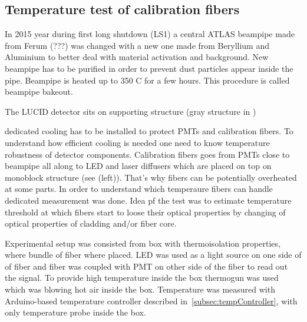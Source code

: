 \subsection{Temperature test of calibration fibers}


In 2015 year during first long shutdown (LS1) a central ATLAS beampipe made from Ferum (???) 
was changed with a new one made from Beryllium and Aluminium to better deal with material activation and background.
New beampipe has to be purified in order to prevent dust particles appear inside the pipe.
Beampipe is heated up to 350 \degree C for a few hours. This procedure is called beampipe bakeout.

The LUCID detector sits on supporting structure (gray structure in )

dedicated cooling has to be installed to protect PMTs and calibration fibers.
To understand how efficient cooling is needed 
one need to know temperature robustness of detector components.
Calibration fibers goes from PMTs close to beampipe all along to LED and laser diffusers which are placed on top on monoblock structure 
(see  (left)).
That's why fibers can be potentially overheated at some parts. 
In order to understand which temperaure fibers can handle dedicated measurement was done. 
Idea pf the test was to estimate temperature threshold at which fibers start to loose their optical properties
by changing of optical properties of cladding and/or fiber core.

Experimental setup was consisted from box with thermoisolation properties, 
where bundle of fiber where placed.
LED was used as a light source on one side of of fiber and fiber was coupled with PMT on other side of the fiber to read out the signal.
To provide high temperature inside the box thermogun was used which was blowing hot air inside the box.
Temperature was measured with Arduino-based temperature controller described in~\ref{subsec:tempController}, with only temperature probe inside the box.

